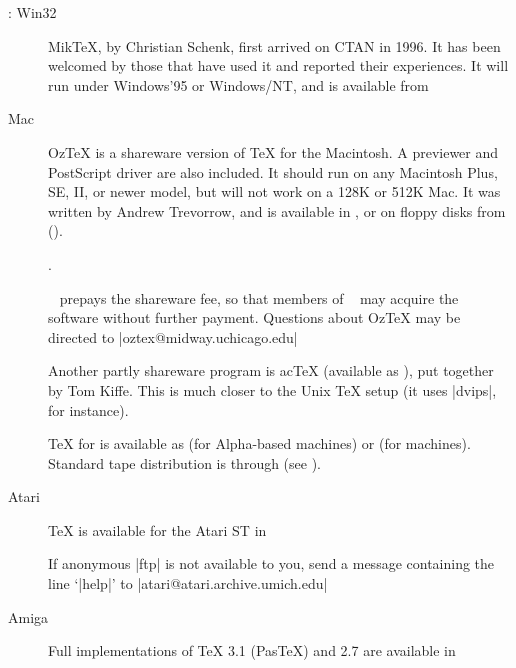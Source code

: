 \begin{description}
\item[: Win32] Mik\TeX{}, by Christian Schenk, first arrived
  on CTAN in 1996.  It has been welcomed by those that have used it
  and reported their experiences.  It will run under Windows'95 or
  Windows/NT, and is available from 

\item[Mac] Oz\TeX{} is a shareware version of \TeX{} for the Macintosh. A
   previewer and PostScript driver are also included. It should run
  on any Macintosh Plus, SE, II, or newer model, but will not work on
  a 128K or 512K Mac. It was written by Andrew Trevorrow, and is
  available in , or on floppy disks from
\htmlignore
   ().
\endhtmlignore
\begin{htmlversion}
  .
\end{htmlversion}
  ~ prepays the shareware fee, so that members of
  ~ may
  acquire the software without further payment.  Questions about
  Oz\TeX{} may be directed to \Email|oztex@midway.uchicago.edu|

  Another partly shareware program is ac\TeX{} (available as
  ), put together by Tom Kiffe. This is much closer
  to the Unix \TeX{} setup (it uses \ProgName|dvips|, for instance).


\item[] \TeX{} for  is available as  (for
  Alpha-based machines) or  (for  machines).
  Standard tape distribution is through 
  (see ).

\item[Atari] \TeX{} is available for the Atari ST in 

  If anonymous |ftp| is not available to you, send a message
  containing the line `|help|' to
  \Email|atari@atari.archive.umich.edu|

\item[Amiga] Full implementations of \TeX{} 3.1 (Pas\TeX{}) and \MF{}
  2.7 are available in 


\end{description}

